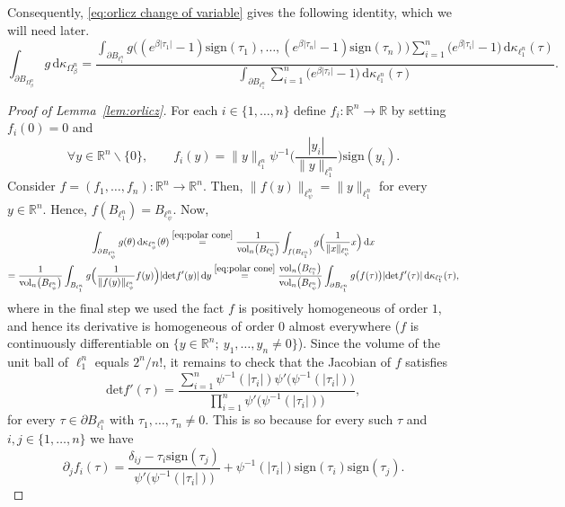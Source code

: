 \documentclass[11pt,reqno]{amsart}
\renewcommand{\setminus}{\smallsetminus}
\newcommand{\ud}[0]{\,\mathrm{d}}
\renewcommand{\det}{\mathrm{det}}
\newcommand{\sign}{\mathrm{sign}}
\newcommand{\n}{\{1,\ldots,n\}}
\newcommand{\R}{\mathbb R}
\theoremstyle{remark}
\newcommand{\vol}{\mathrm{vol}}
\renewcommand{\1}{\mathbf 1}
\begin{document}
Consequently, \eqref{eq:orlicz change of variable}  gives the following identity, which we will need later.
\begin{equation}
\int_{\partial B_{\Omega_\beta^n}} g\ud\kappa_{\Omega_\beta^n}=\frac{ \int_{\partial B_{\ell_1^n}} g\big((e^{\beta|\tau_1|}-1)\sign(\tau_1),\ldots,(e^{\beta|\tau_n|}-1)\sign(\tau_n)\big)\sum_{i=1}^n \big(e^{\beta|\tau_i|}-1\big)\ud \kappa_{\ell_1^n}(\tau)}{\int_{\partial B_{\ell_1^n}} \sum_{i=1}^n \big(e^{\beta|\tau_i|}-1\big)\ud \kappa_{\ell_1^n}(\tau)}.
\end{equation}

\begin{proof}[Proof of Lemma~\ref{lem:orlicz}] For each $i\in \n$ define $f_i:\R^n\to \R$ by setting $f_i(0)=0$ and
$$
\forall y\in \R^n\setminus\{0\},\qquad f_i(y)=\|y\|_{\ell_1^n}\psi^{-1}\Big(\frac{|y_i|}{\|y\|_{\ell_1^n}}\Big)\sign(y_i).
$$
Consider $f=(f_1,\ldots,f_n):\R^n\to \R^n$.  Then, $\|f(y)\|_{\ell_\psi^n}=\|y\|_{\ell_1^n}$ for every $y\in \R^n$. Hence, $f(B_{\ell_1^n})=B_{\ell_\psi^n}$. Now,
\begin{multline*}
\int_{\partial B_{\ell_{\psi}^n}} g(\theta)\ud \kappa_{\ell_{\psi}^n}(\theta) \stackrel{\eqref{eq:polar cone}}{=}\frac{1}{\vol_n\big(B_{\ell_\psi^n}\big)}\int_{f(B_{\ell_1^n})} g\Big(\frac{1}{\|x\|_{\ell_\psi^n}}x\Big)\ud x\\= \frac{1}{\vol_n\big(B_{\ell_\psi^n}\big)}\int_{B_{\ell_1^n}} g\Big(\frac{1}{\|f(y)\|_{\ell_\psi^n}}f(y)\Big) |\det f'(y)|\ud y\stackrel{\eqref{eq:polar cone}}{=}\frac{\vol_n\big(B_{\ell_1^n}\big)}{\vol_n\big(B_{\ell_\psi^n}\big)}\int_{\partial B_{\ell_1^n}} g\big(f(\tau)\big) |\det f'(\tau)|\ud \kappa_{\ell_1^n}(\tau),
\end{multline*}
where in the final step we used the fact $f$ is positively homogeneous of order $1$, and hence its derivative is homogeneous of order $0$ almost everywhere ($f$ is   continuously differentiable on $\{y\in \R^n;\ y_1,\ldots,y_n\neq 0\}$). Since the volume of the unit ball of $\ell_1^n$ equals $2^n/n!$, it remains to check that the Jacobian of $f$ satisfies
\begin{equation*}
 \det f'(\tau)=\frac{\sum_{i=1}^n \psi^{-1}(|\tau_i|)\psi'\big(\psi^{-1}(|\tau_i|)\big)}{\prod_{i=1}^n\psi'\big(\psi^{-1}(|\tau_i|)\big)},
\end{equation*}
for every $\tau\in \partial B_{\ell_1^n}$ with $\tau_1,\ldots,\tau_n\neq 0$. This is so because for every such $\tau$ and  $i,j\in \n$ we have
$$
\partial_j f_i(\tau)=\frac{\delta_{ij}-\tau_i\sign(\tau_j)}{\psi'\big(\psi^{-1}(|\tau_i|)\big)} +\psi^{-1}(|\tau_i|)\sign(\tau_i)\sign(\tau_j).
$$
\end{proof}
\end{document}
